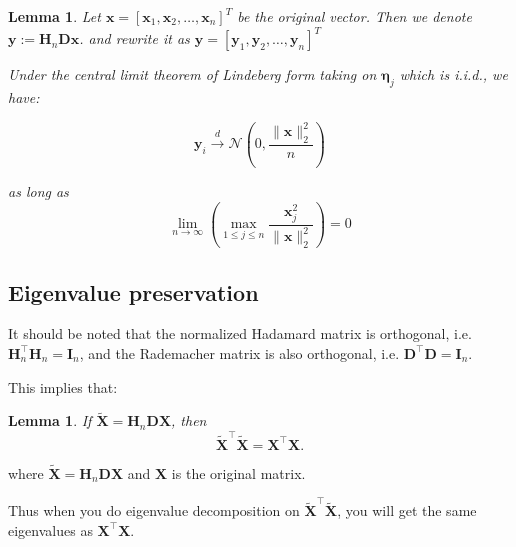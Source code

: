\documentclass[11pt]{article}
\numberwithin{equation}{section}
\theoremstyle{plain}
\newtheorem{lemma}[theorem]{Lemma}
\theoremstyle{definition}
\theoremstyle{remark}
\begin{document}
\begin{lemma}
  \label{lem:asymptotic-normality}
  Let $\mathbf{x} = [\mathbf{x}_1, \mathbf{x}_2, \ldots, \mathbf{x}_n]^T$ be the original vector. 
  Then we denote $\mathbf{y}:=\mathbf{H}_n\mathbf{D}\mathbf{x}$.
  and rewrite it as $\mathbf{y} = [\mathbf{y}_1, \mathbf{y}_2, \ldots, \mathbf{y}_n]^T$
  
  Under the central limit theorem of Lindeberg form taking on $\mathbf{\eta}_{j}$ which is i.i.d., we have:

  \[
  \mathbf{y}_{i} \xrightarrow{\;d\;} \mathcal N\left(0,\frac{\|\mathbf{x}\|_2^2}{n}\right)\tag{6.5}\label{eq:6.5}
  \]

  as long as
  \[
  \lim_{n\to\infty}\left(\max_{1\leq j\leq n}\frac{\mathbf{x}_j^2}{\|\mathbf{x}\|_2^2}\right)=0 \tag{6.6} \label{eq:6.6}
  \]
\end{lemma}

\subsection{Eigenvalue preservation}
It should be noted that the normalized Hadamard matrix is orthogonal, i.e. $\mathbf{H}_n^{\top}\mathbf{H}_n = \mathbf{I}_n$, and the Rademacher matrix is also orthogonal, i.e. $\mathbf{D}^{\top}\mathbf{D} = \mathbf{I}_n$.

This implies that:
\begin{lemma}
    \label{lem:eigenvalue-preservation}
    If $\mathbf{\tilde{X}} = \mathbf{H}_n\mathbf{D}\mathbf{X}$, then
    \[
    \mathbf{\tilde{X}}^{\top}\mathbf{\tilde{X}} = \mathbf{X}^{\top}\mathbf{X}. \tag{6.7}\label{eq:6.7}
    \]
\end{lemma}

where $\mathbf{\tilde{X}} = \mathbf{H}_n\mathbf{D}\mathbf{X}$ and $\mathbf{X}$ is the original matrix.

Thus when you do eigenvalue decomposition on $\mathbf{\tilde{X}}^{\top}\mathbf{\tilde{X}}$, you will get the same eigenvalues as $\mathbf{X}^{\top}\mathbf{X}$.
\end{document}
